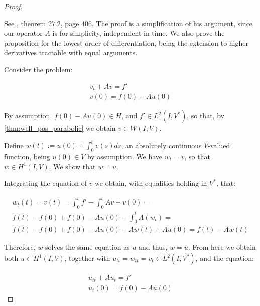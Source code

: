\documentclass[english,a4paper,10pt,oneside]{scrbook}	%
\theoremstyle{break}
\newenvironment{mproof}[1][\proofname]{%
  \begin{proof}[#1]$ $\par\nobreak\ignorespaces
}{%
  \end{proof}
}
\renewcommand*{\proofname}{Proof}
\theoremstyle{remark}
\newcommand{\ds}{\displaystyle}
\begin{document}
\begin{mproof}

See \cite{wloka}, theorem 27.2, page 406. The proof is a simplification of his argument, since our operator $A$ is for simplicity, independent in time. We also prove the proposition for the lowest order of differentiation, being the extension to higher derivatives  tractable with equal arguments.

Consider the problem:

\begin{align*}
	v_t + Av = f'\\
	v(0) = f(0) - Au (0)
\end{align*}

By assumption, $f(0) - Au (0) \in H$, and $f' \in L^2(I,V^*)$, so that, by \cref{thm:well_pos_parabolic} we obtain $v \in W(I;V)$.

Define $w(t):=u(0) + \ds \int_0^tv(s)ds$, an absolutely continuous $V$-valued function, being $u(0) \in V$ by assumption. We have $w_t = v$, so that $w \in H^1(I,V)$. We show that $w = u$.

Integrating the equation of $v$ we obtain, with equalities holding in $V^*$, that:

\begin{align*}
	w_t(t) = v(t) = \int_0^t f' -\int_0^t Av + v(0) = \\
	f(t) - f(0) + f(0) - Au(0) - \int_0^t A(w_t) = \\
	f(t) - f(0) + f(0) - Au(0) - Aw (t) + Au(0) = f(t) - Aw(t)
\end{align*}

Therefore, $w$ solves the same equation as $u$ and thus, $w=u$. From here we obtain both $u \in H^1(I,V)$, together with $u_{tt} = w_{tt} = v_t \in L^2(I,V^*)$, and the equation:

\begin{align*}
	u_{tt} + Au_t = f'\\
	u_t(0) = f(0) - Au (0)
\end{align*}

\end{mproof}

\end{document}
